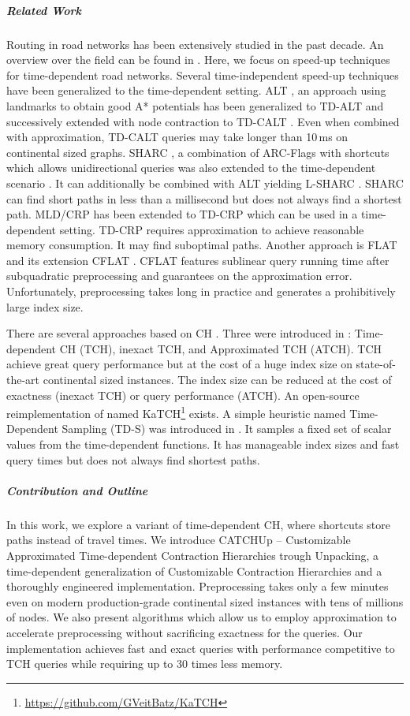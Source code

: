 \documentclass[a4paper,UKenglish,cleveref,autoref]{lipics-v2019}
\newcommand{\tdcch}{CATCHUp}
\begin{document}
\subparagraph*{Related Work}

Routing in road networks has been extensively studied in the past decade.
An overview over the field can be found in \cite{bdgmpsww-rptn-16}.
Here, we focus on speed-up techniques for time-dependent road networks.
Several time-independent speed-up techniques have been generalized to the time-dependent setting.
ALT \cite{gh-cspas-05}, an approach using landmarks to obtain good A* \cite{hnr-afbhd-68} potentials has been generalized to TD-ALT \cite{ndls-bastd-12} and successively extended with node contraction to TD-CALT \cite{dn-crdtd-12}.
Even when combined with approximation, TD-CALT queries may take longer than 10\,ms on continental sized graphs.
SHARC \cite{bd-sharc-09}, a combination of ARC-Flags \cite{l-aefea-04} with shortcuts which allows unidirectional queries was also extended to the time-dependent scenario \cite{d-tdsr-11}.
It can additionally be combined with ALT yielding L-SHARC \cite{d-tdsr-11}.
SHARC can find short paths in less than a millisecond but does not always find a shortest path.
MLD/CRP \cite{dgpw-crprn-13,hsw-emlog-08} has been extended to TD-CRP \cite{bdpw-dtdrp-16} which can be used in a time-dependent setting.
TD-CRP requires approximation to achieve reasonable memory consumption.
It may find suboptimal paths.
Another approach is FLAT \cite{kmppwz-eotdr-16} and its extension CFLAT \cite{kppwz-iotdr-17a}.
CFLAT features sublinear query running time after subquadratic preprocessing and guarantees on the approximation error.
Unfortunately, preprocessing takes long in practice and generates a prohibitively large index size.

There are several approaches based on CH \cite{gssv-erlrn-12}.
Three were introduced in \cite{bgsv-mtdtt-13}: Time-dependent CH (TCH), inexact TCH, and Approximated TCH (ATCH).
TCH achieve great query performance but at the cost of a huge index size on state-of-the-art continental sized instances.
The index size can be reduced at the cost of exactness (inexact TCH) or query performance (ATCH).
An open-source reimplementation of \cite{bgsv-mtdtt-13} named KaTCH\footnote{\url{https://github.com/GVeitBatz/KaTCH}} exists.
A simple heuristic named Time-Dependent Sampling (TD-S) was introduced in \cite{s-dtdrr-17}.
It samples a fixed set of scalar values from the time-dependent functions.
It has manageable index sizes and fast query times but does not always find shortest paths.

\subparagraph*{Contribution and Outline}

In this work, we explore a variant of time-dependent CH, where shortcuts store paths instead of travel times.
We introduce \tdcch{} -- Customizable Approximated Time-dependent Contraction Hierarchies trough Unpacking, a time-dependent generalization of Customizable Contraction Hierarchies \cite{dsw-cch-15} and a thoroughly engineered implementation.
Preprocessing takes only a few minutes even on modern production-grade continental sized instances with tens of millions of nodes.
We also present algorithms which allow us to employ approximation to accelerate preprocessing without sacrificing exactness for the queries.
Our implementation achieves fast and exact queries with performance competitive to TCH queries while requiring up to 30 times less memory.
\end{document}
